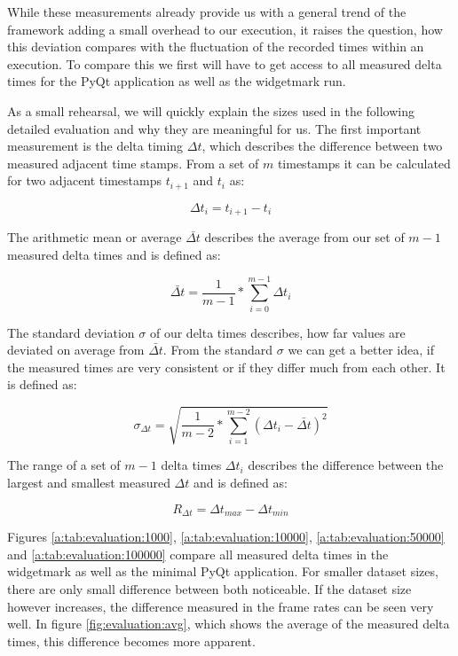 While these measurements already provide us with a general trend of the
framework adding a small overhead to our execution, it raises the question, how
this deviation compares with the fluctuation of the recorded times within an
execution. To compare this we first will have to get access to all measured
delta times for the PyQt application as well as the widgetmark run.

As a small rehearsal, we will quickly explain the sizes used in the following
detailed evaluation and why they are meaningful for us. The first important
measurement is the delta timing $\Delta t$, which describes the difference
between two measured adjacent time stamps. From a set of $m$ timestamps it can
be calculated for two adjacent timestamps $t_{i+1}$ and $t_i$ as:

$$\Delta t_{i} = t_{i+1} - t_{i}$$

The arithmetic mean or average $\bar{\Delta t}$ describes the average from our
set of $m-1$ measured delta times and is defined as:

$$\bar{\Delta t} = \frac{1}{m-1} * \sum_{i=0}^{m-1} {\Delta t_{i}}$$

The standard deviation $\sigma$ of our delta times describes, how far values are
deviated on average from $\bar{\Delta t}$. From the standard $\sigma$ we can get
a better idea, if the measured times are very consistent or if they differ much
from each other. It is defined as:

$$ \sigma_{\Delta t} = \sqrt{\frac{1}{m-2} * \sum_{i=1}^{m-2} (\Delta t_{i} - \bar{\Delta t})^2} $$

The range of a set of $m-1$ delta times $\Delta t_i$ describes the difference
between the largest and smallest measured $\Delta t$ and is defined as:

$$R_{\Delta t} = \Delta t_{max} - \Delta t_{min}$$

Figures \ref{a:tab:evaluation:1000}, \ref{a:tab:evaluation:10000},
\ref{a:tab:evaluation:50000} and \ref{a:tab:evaluation:100000} compare all
measured delta times in the widgetmark as well as the minimal PyQt application.
For smaller dataset sizes, there are only small difference between both
noticeable. If the dataset size however increases, the difference measured in
the frame rates can be seen very well. In figure \ref{fig:evaluation:avg}, which
shows the average of the measured delta times, this difference becomes more
apparent.

